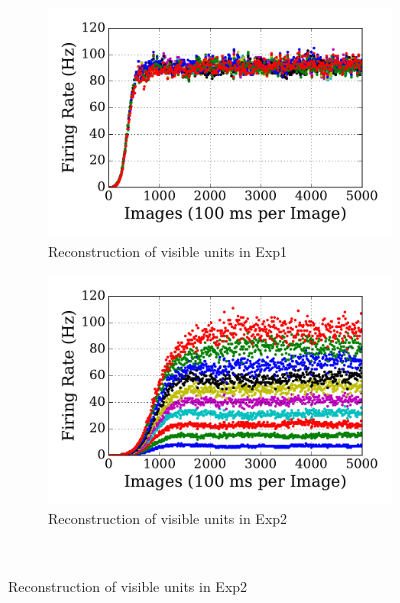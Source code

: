 \begin{figure}
\DIFdelendFL \DIFaddbeginFL \begin{subfigure}[t]{0.48\textwidth}
		\DIFaddendFL \includegraphics[width=\textwidth]{pics_sdlm/00_exp_SAE_Orig/exp1_recon_s.pdf}
		\caption{Reconstruction of visible units in Exp1}
	\end{subfigure}
	\DIFdelbeginFL %
\DIFdelendFL \DIFaddbeginFL \begin{subfigure}[t]{0.48\textwidth}
		\DIFaddendFL \includegraphics[width=\textwidth]{pics_sdlm/00_exp_SAE_Orig/exp2_recon_s.pdf}
		\caption{Reconstruction of visible units in Exp2}
	\end{subfigure}\\
	\DIFdelbeginFL %

\end{figure}
